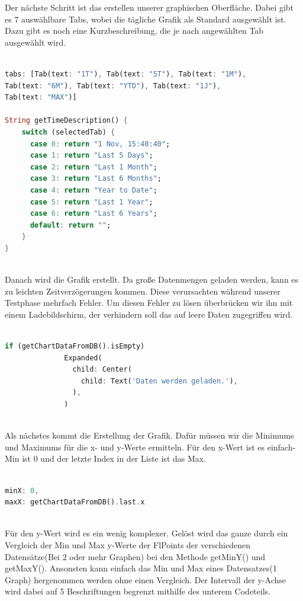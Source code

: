 \documentclass[11pt]{scrartcl}
\begin{document}
Der nächste Schritt ist das erstellen unserer graphischen Oberfläche. Dabei gibt es 7 auswählbare Tabs, wobei die tägliche Grafik als Standard ausgewählt ist.
Dazu gibt es noch eine Kurzbeschreibung, die je nach angewählten Tab ausgewählt wird.

\begin{lstlisting}[language=Dart]

tabs: [Tab(text: "1T"), Tab(text: "5T"), Tab(text: "1M"),
Tab(text: "6M"), Tab(text: "YTD"), Tab(text: "1J"),
Tab(text: "MAX")]

String getTimeDescription() {
    switch (selectedTab) {
      case 0: return "1 Nov, 15:40:40";
      case 1: return "Last 5 Days";
      case 2: return "Last 1 Month";
      case 3: return "Last 6 Months";
      case 4: return "Year to Date";
      case 5: return "Last 1 Year";
      case 6: return "Last 6 Years";
      default: return "";
    }
}
    
\end{lstlisting}

Danach wird die Grafik erstellt. Da große Datenmengen geladen werden, kann es zu leichten Zeitverzögerungen kommen. Diese verursachten während unserer Testphase mehrfach Fehler. Um diesen Fehler zu lösen überbrücken wir ihn mit einem Ladebildschirm, der verhindern soll das auf leere Daten zugegriffen wird.

\begin{lstlisting}[language=Dart]

if (getChartDataFromDB().isEmpty)
              Expanded(
                child: Center(
                  child: Text('Daten werden geladen.'),
                ),
              )
    
\end{lstlisting}

Als nächstes kommt die Erstellung der Grafik. Dafür müssen wir die Minimums und Maximums für die x- und y-Werte ermitteln. Für den x-Wert ist es einfach- Min ist  0 und der letzte Index in der Liste ist das Max.

\begin{lstlisting}[language=Dart]

minX: 0,
maxX: getChartDataFromDB().last.x
    
\end{lstlisting}

Für den y-Wert wird es ein wenig komplexer. Gelöst wird das ganze durch ein Vergleich der Min und Max y-Werte der FlPoints der verschiedenen Datensätze(Bei 2 oder mehr Graphen) bei den Methode getMinY() und getMaxY(). Ansonsten kann einfach das Min und Max eines Datensatzes(1 Graph) hergenommen werden ohne einen Vergleich. Der Intervall der y-Achse wird dabei auf 5 Beschriftungen begrenzt mithilfe des unterem Codeteils.
\end{document}
